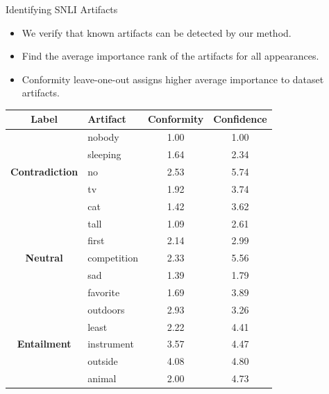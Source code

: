 \documentclass[final]{beamer} %
\newcommand{\loo}{leave-one-out}
\begin{document}
\begin{frame}
\begin{columns}
\begin{column}{.5\linewidth}
\begin{block}{Identifying SNLI Artifacts}
\begin{itemize}
\item We verify that known artifacts can be detected by our method.
\item Find the average importance rank of the artifacts for all appearances.
\item Conformity leave-one-out assigns higher average importance to dataset artifacts.
\end{itemize}
\begin{center}
\centering
\begin{tabular}{clcc}
\toprule
\textbf{Label} & \textbf{Artifact} & \textbf{Conformity} & \textbf{Confidence} \\
\midrule
\multirow{5}{*}{\textbf{Contradiction}}
& nobody & 1.00 & 1.00 \\
& sleeping & 1.64 & 2.34 \\
& no & 2.53 & 5.74 \\
& tv & 1.92 & 3.74 \\
& cat & 1.42 & 3.62 \\
\midrule
\multirow{5}{*}{\textbf{Neutral}}
& tall & 1.09 & 2.61 \\
& first & 2.14 & 2.99 \\
& competition & 2.33 & 5.56 \\
& sad & 1.39 & 1.79 \\
& favorite & 1.69 & 3.89 \\
\midrule
\multirow{5}{*}{\textbf{Entailment}}
& outdoors & 2.93 & 3.26 \\
& least & 2.22 & 4.41 \\
& instrument & 3.57 & 4.47 \\
& outside & 4.08 & 4.80 \\
& animal & 2.00 & 4.73 \\
\end{tabular}
\end{center}
\end{block}


\end{column}
\end{columns}
\end{frame}
\end{document}

